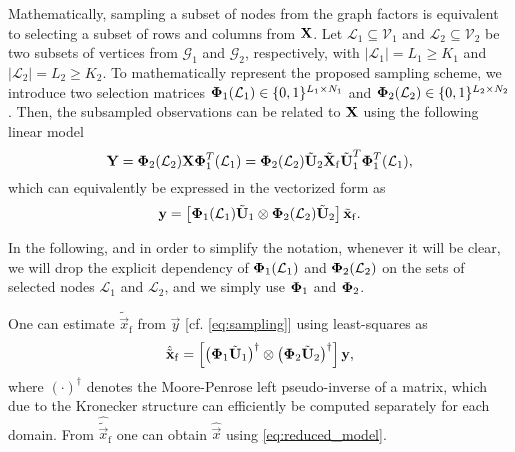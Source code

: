 \documentclass{article}
\begin{document}
Mathematically, sampling a subset of nodes from the graph factors is equivalent to selecting a subset of rows and columns from $\boldsymbol{\mathrm{X}}$. Let $\mathcal{L}_1\subseteq\mathcal{V}_1$ and $\mathcal{L}_2\subseteq\mathcal{V}_2$ be two subsets of vertices from $\mathcal{G}_1$ and $\mathcal{G}_2$, respectively, with $|\mathcal{L}_1|=L_1\geq K_1$ and $|\mathcal{L}_2|=L_2\geq K_2$. To mathematically represent the proposed sampling scheme, we introduce two selection matrices $\boldsymbol{\mathrm{\Phi}}_1(\mathcal{L}_1)\in\{0,1\}^{L_1\times N_1}$ and $\boldsymbol{\mathrm{\Phi}}_2(\mathcal{L}_2)\in\{0,1\}^{L_2\times N_2}$. Then, the subsampled observations can be related to ${\bf X}$ using the following linear model
\begin{equation*}
	\boldsymbol{\mathrm{Y}}=\boldsymbol{\mathrm{\Phi}}_2(\mathcal{L}_2)\boldsymbol{\mathrm{X}}\boldsymbol{\mathrm{\Phi}}^T_1(\mathcal{L}_1)=\boldsymbol{\mathrm{\Phi}}_2(\mathcal{L}_2)\tilde{\boldsymbol{\mathrm{U}}}_2\tilde{\boldsymbol{\mathrm{X}}}_\mathrm{f}\tilde{\boldsymbol{\mathrm{U}}}_1^T\boldsymbol{\mathrm{\Phi}}^T_1(\mathcal{L}_1),
\end{equation*}
which can equivalently be expressed in the vectorized form as
\begin{equation}
	\boldsymbol{\mathrm{y}}=\left[\boldsymbol{\mathrm{\Phi}}_1(\mathcal{L}_1)\tilde{\boldsymbol{\mathrm{U}}}_1\otimes\boldsymbol{\mathrm{\Phi}}_2(\mathcal{L}_2)\tilde{\boldsymbol{\mathrm{U}}}_2\right]\tilde{\boldsymbol{\mathrm{x}}}_\mathrm{f}. \label{eq:sampling}
\end{equation}

In the following, and in order to simplify the notation, whenever it will be clear, we will drop the explicit dependency of $\boldsymbol{\mathrm{\Phi}}_1(\mathcal{L}_1)$ and $\boldsymbol{\mathrm{\Phi}}_2(\mathcal{L}_2)$ on the sets of selected nodes $\mathcal{L}_1$ and $\mathcal{L}_2$, and we simply use $\boldsymbol{\mathrm{\Phi}}_1$ and $\boldsymbol{\mathrm{\Phi}}_2$.

One can estimate $\tilde{\vec{x}}_\mathrm{f}$ from $\vec{y}$ [cf. \eqref{eq:sampling}] using least-squares as
\begin{equation}
	\hat{\tilde{\boldsymbol{\mathrm{x}}}}_\mathrm{f}=\left[\left(\boldsymbol{\mathrm{\Phi}}_1\tilde{\boldsymbol{\mathrm{U}}}_1\right)^\dagger\otimes\left(\boldsymbol{\mathrm{\Phi}}_2\tilde{\boldsymbol{\mathrm{U}}}_2\right)^\dagger\right]\boldsymbol{\mathrm{y}},\label{eq:xf_hat}
\end{equation}
where $(\cdot)^\dagger$ denotes the Moore-Penrose left pseudo-inverse of a matrix, which due to the Kronecker structure can efficiently be computed separately for each domain. From $\hat{\tilde{\vec{x}}}_\mathrm{f}$ one can obtain $\hat{\vec{x}}$ using \eqref{eq:reduced_model}.
\end{document}
